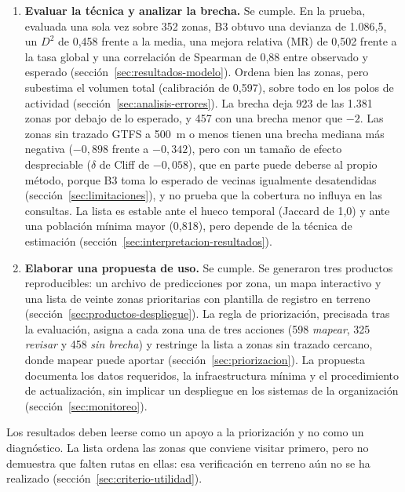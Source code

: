 \begin{enumerate}
  \item [OE3.] \textbf{Evaluar la técnica y analizar la brecha.} Se cumple. En la prueba,
        evaluada una sola vez sobre 352 zonas, B3 obtuvo una devianza de 1.086,5, un $D^2$ de
        0,458 frente a la media, una mejora relativa (MR) de 0,502 frente a la tasa global y una correlación de
        Spearman de 0,88 entre observado y esperado (sección~\ref{sec:resultados-modelo}).
        Ordena bien las zonas, pero subestima el volumen total (calibración de 0,597),
        sobre todo en los polos de actividad (sección~\ref{sec:analisis-errores}). La brecha
        deja 923 de las 1.381 zonas por debajo de lo esperado, y 457 con una brecha menor que
        $-2$. Las zonas sin trazado GTFS a 500~m o menos tienen una brecha mediana más
        negativa ($-0{,}898$ frente a $-0{,}342$), pero con un tamaño de efecto despreciable
        ($\delta$ de Cliff de $-0{,}058$), que en parte puede deberse al propio método, porque
        B3 toma lo esperado de vecinas igualmente desatendidas (sección~\ref{sec:limitaciones}),
        y no prueba que la cobertura no influya en las consultas. La lista es estable ante el hueco temporal
        (Jaccard de 1,0) y ante una población mínima mayor (0,818), pero depende de la
        técnica de estimación (sección~\ref{sec:interpretacion-resultados}).

  \item [OE4.] \textbf{Elaborar una propuesta de uso.} Se cumple. Se generaron tres
        productos reproducibles: un archivo de predicciones por zona, un mapa interactivo y
        una lista de veinte zonas prioritarias con plantilla de registro en terreno
        (sección~\ref{sec:productos-despliegue}). La regla de priorización, precisada tras
        la evaluación, asigna a cada zona una de tres acciones (598 \emph{mapear}, 325
        \emph{revisar} y 458 \emph{sin brecha}) y restringe la lista a zonas sin trazado
        cercano, donde mapear puede aportar (sección~\ref{sec:priorizacion}). La propuesta
        documenta los datos requeridos, la infraestructura mínima y el procedimiento de
        actualización, sin implicar un despliegue en los sistemas de la organización
        (sección~\ref{sec:monitoreo}).
\end{enumerate}

Los resultados deben leerse como un apoyo a la priorización y no como un diagnóstico. La
lista ordena las zonas que conviene visitar primero, pero no demuestra que falten rutas en
ellas: esa verificación en terreno aún no se ha realizado (sección~\ref{sec:criterio-utilidad}).

